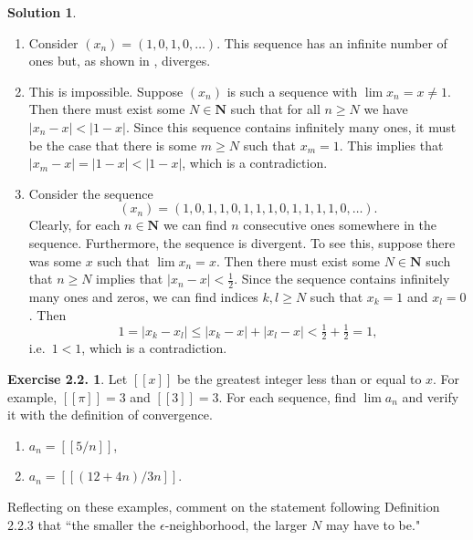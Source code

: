 \documentclass[12pt]{article}
\theoremstyle{definition}
\theoremstyle{exercise}
\newtheorem{exercise}{Exercise 2.2.}
\theoremstyle{solution}
\newtheorem*{solution}{Solution}
\newcommand{\N}{\mathbf{N}}
\begin{document}
\begin{solution}
    \begin{enumerate}
        \item Consider \( (x_n) = (1, 0, 1, 0, \ldots) \). This sequence has an infinite number of ones but, as shown in , diverges.

        \item This is impossible. Suppose \( (x_n) \) is such a sequence with \( \lim x_n = x \neq 1 \). Then there must exist some \( N \in \N \) such that for all \( n \geq N \) we have \( |x_n - x| < |1 - x| \). Since this sequence contains infinitely many ones, it must be the case that there is some \( m \geq N \) such that \( x_m = 1 \). This implies that \( |x_m - x| = |1 - x| < |1 - x| \), which is a contradiction.

        \item Consider the sequence
        \[
            (x_n) = (1, 0, 1, 1, 0, 1, 1, 1, 0, 1, 1, 1, 1, 0, \ldots).
        \]
        Clearly, for each \( n \in \N \) we can find \( n \) consecutive ones somewhere in the sequence. Furthermore, the sequence is divergent. To see this, suppose there was some \( x \) such that \( \lim x_n = x \). Then there must exist some \( N \in \N \) such that \( n \geq N \) implies that \( |x_n - x| < \tfrac{1}{2} \). Since the sequence contains infinitely many ones and zeros, we can find indices \( k, l \geq N \) such that \( x_k = 1 \) and \( x_l = 0 \). Then
        \[
            1 = |x_k - x_l| \leq |x_k - x| + |x_l - x| < \tfrac{1}{2} + \tfrac{1}{2} = 1,
        \]
        i.e.\ \( 1 < 1 \), which is a contradiction.
    \end{enumerate}
\end{solution}

\begin{exercise}
\label{ex:5}
    Let \( [[x]] \) be the greatest integer less than or equal to \( x \). For example, \( [[\pi]] = 3 \) and \( [[3]] = 3 \). For each sequence, find \( \lim a_n \) and verify it with the definition of convergence.
    \begin{enumerate}
        \item \( a_n = [[5/n]] \),

        \item \( a_n = [[(12 + 4n)/3n]] \).
    \end{enumerate}
    Reflecting on these examples, comment on the statement following Definition 2.2.3 that ``the smaller the \(\epsilon\)-neighborhood, the larger \( N \) may have to be."
\end{exercise}
\end{document}

